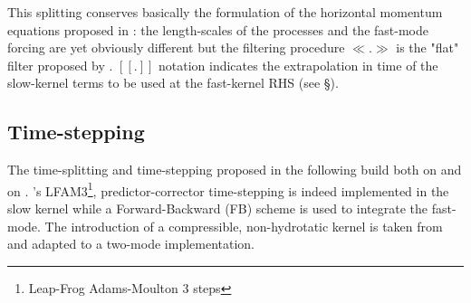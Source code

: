 This splitting conserves basically the formulation of the horizontal momentum equations proposed in \cite{shchepetkin_regional_2005}: the length-scales of the processes and the fast-mode forcing are yet obviously different but the filtering procedure $\ll.\gg$ is the "flat" filter proposed by \cite{shchepetkin_regional_2005}. $[[.]]$ notation indicates the extrapolation in time of the slow-kernel terms to be used at the fast-kernel RHS (see \S {}).\\


\subsection{Time-stepping}
The time-splitting and time-stepping proposed in the following build both on \cite{shchepetkin_regional_2005} and on \cite{Auclair2018}.   \cite{shchepetkin_regional_2005}'s LFAM3\footnote{Leap-Frog Adams-Moulton 3 steps}, predictor-corrector time-stepping is indeed implemented in the slow kernel while a Forward-Backward (FB) scheme is used to integrate the fast-mode. The introduction of a compressible, non-hydrotatic kernel is taken from \cite{Auclair2018} and adapted to a two-mode implementation.

